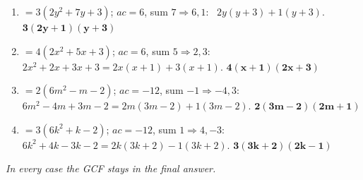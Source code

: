 \documentclass[11pt]{article}
\begin{document}
\begin{anskey}[title={Practice E --- GCF First}]
\begin{enumerate}[label=\textbf{\arabic*.},leftmargin=2em,itemsep=5pt]
\item $= 3(2y^2+7y+3)$; $ac=6$, sum $7 \Rightarrow 6,1$: \ $2y(y+3)+1(y+3)$.
\quad $\mathbf{3(2y+1)(y+3)}$
\item $= 4(2x^2+5x+3)$; $ac=6$, sum $5 \Rightarrow 2,3$: \
$2x^2+2x+3x+3 = 2x(x+1)+3(x+1)$. \quad $\mathbf{4(x+1)(2x+3)}$
\item $= 2(6m^2-m-2)$; $ac=-12$, sum $-1 \Rightarrow -4,3$: \
$6m^2-4m+3m-2 = 2m(3m-2)+1(3m-2)$. \quad $\mathbf{2(3m-2)(2m+1)}$
\item $= 3(6k^2+k-2)$; $ac=-12$, sum $1 \Rightarrow 4,-3$: \
$6k^2+4k-3k-2 = 2k(3k+2)-1(3k+2)$. \quad $\mathbf{3(3k+2)(2k-1)}$
\end{enumerate}
\emph{In every case the GCF stays in the final answer.}
\end{anskey}
\end{document}
